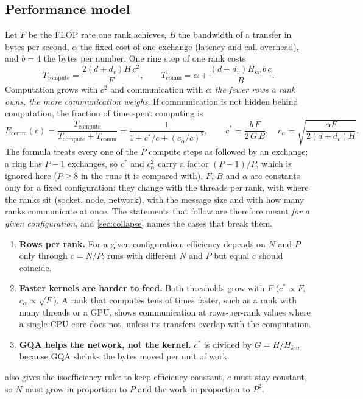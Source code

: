 \documentclass[10pt,a4paper]{article}
\begin{document}
\subsection{Performance model}\label{sec:model}
Let $F$ be the FLOP rate one rank achieves, $B$ the bandwidth of a transfer in
bytes per second, $\alpha$ the fixed cost of one exchange (latency and call
overhead), and $b=4$ the bytes per number. One ring step of one rank costs
\begin{equation}
 T_\text{compute}=\frac{2(d+d_v)H\,c^2}{F},\qquad
 T_\text{comm}=\alpha+\frac{(d+d_v)H_{kv}\,b\,c}{B}. \label{eq:step}
\end{equation}
Computation grows with $c^2$ and communication with $c$: \emph{the fewer rows a rank
owns, the more communication weighs}. If communication is not hidden behind
computation, the fraction of time spent computing is
\begin{equation}
 E_\text{comm}(c)=\frac{T_\text{compute}}{T_\text{compute}+T_\text{comm}}
 =\frac{1}{1+c^{*}/c+(c_\alpha/c)^2},\qquad
 c^{*}=\frac{b\,F}{2\,G\,B},\quad c_\alpha=\sqrt{\frac{\alpha F}{2(d+d_v)H}} .
 \label{eq:model}
\end{equation}
The formula treats every one of the $P$ compute steps as followed by an exchange; a
ring has $P-1$ exchanges, so $c^*$ and $c_\alpha^2$ carry a factor $(P-1)/P$, which is
ignored here ($P\ge8$ in the runs it is compared with). $F$, $B$ and $\alpha$ are
constants only for a fixed configuration: they change with the threads per rank,
with where the ranks sit (socket, node, network), with the message size and with
how many ranks communicate at once. The statements that follow are therefore meant
\emph{for a given configuration}, and \cref{sec:collapse} names the cases that
break them.
\begin{enumerate}
\item \textbf{Rows per rank.} For a given configuration, efficiency depends on $N$
and $P$ only through $c=N/P$: runs with different $N$ and $P$ but equal $c$ should
coincide.
\item \textbf{Faster kernels are harder to feed.} Both thresholds grow with $F$
($c^*\propto F$, $c_\alpha\propto\sqrt F$). A rank that computes tens of times
faster, such as a rank with many threads or a GPU, shows communication at
rows-per-rank values where a single CPU core does not, unless its transfers
overlap with the computation.
\item \textbf{GQA helps the network, not the kernel.} $c^*$ is divided by
$G=H/H_{kv}$, because GQA shrinks the bytes moved per unit of work.
\end{enumerate}
 also gives the isoefficiency rule: to keep efficiency constant, $c$
must stay constant, so $N$ must grow in proportion to $P$ and the work in proportion
to $P^2$.
\end{document}
